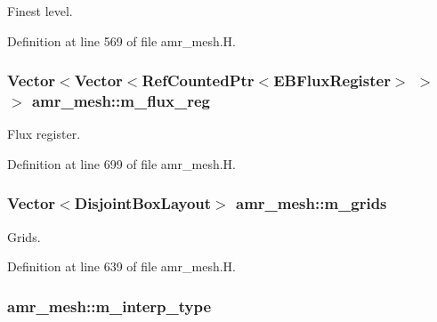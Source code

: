 Finest level. 



Definition at line 569 of file amr\+\_\+mesh.\+H.

\subsubsection[{\texorpdfstring{m\+\_\+flux\+\_\+reg}{m_flux_reg}}]{\setlength{\rightskip}{0pt plus 5cm}Vector$<$Vector$<$Ref\+Counted\+Ptr$<$E\+B\+Flux\+Register$>$ $>$ $>$ amr\+\_\+mesh\+::m\+\_\+flux\+\_\+reg\hspace{0.3cm}{\ttfamily [protected]}}\hypertarget{classamr__mesh_a5d61b708ca98849c2dbbddea33cc3808}{}\label{classamr__mesh_a5d61b708ca98849c2dbbddea33cc3808}


Flux register. 



Definition at line 699 of file amr\+\_\+mesh.\+H.

\subsubsection[{\texorpdfstring{m\+\_\+grids}{m_grids}}]{\setlength{\rightskip}{0pt plus 5cm}Vector$<$Disjoint\+Box\+Layout$>$ amr\+\_\+mesh\+::m\+\_\+grids\hspace{0.3cm}{\ttfamily [protected]}}\hypertarget{classamr__mesh_a40f1252cc2314c8ddb16d94ce024adce}{}\label{classamr__mesh_a40f1252cc2314c8ddb16d94ce024adce}


Grids. 



Definition at line 639 of file amr\+\_\+mesh.\+H.

\subsubsection[{\texorpdfstring{m\+\_\+interp\+\_\+type}{m_interp_type}}]{ amr\+\_\+mesh\+::m\+\_\+interp\+\_\+type\hspace{0.3cm}{\ttfamily [protected]}}\hypertarget{classamr__mesh_ad83f7626ddaaaaf3e5026d1f54a89a5b}{}\label{classamr__mesh_ad83f7626ddaaaaf3e5026d1f54a89a5b}


